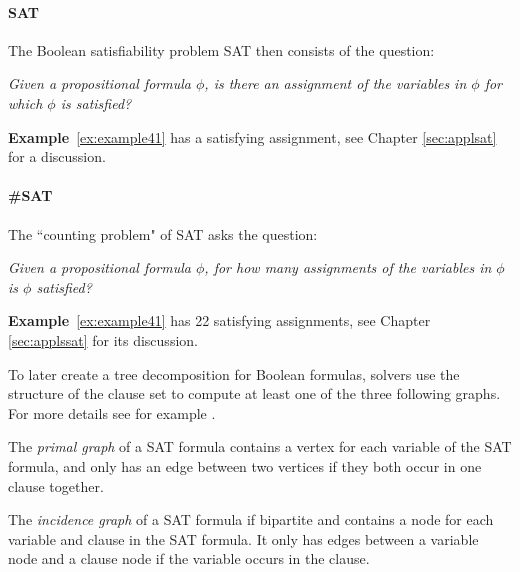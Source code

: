 \documentclass[a4paper, 12pt, bibliography=totoc]{scrartcl}
\begin{document}
\paragraph{SAT}The Boolean satisfiability problem {SAT} then consists of the question: 
\begin{mdframed}[leftmargin=3em,rightmargin=3em]
 \textit{Given a propositional formula $\phi$, is there an assignment of the variables in $\phi$ for which $\phi$ is satisfied?} 
\end{mdframed}
\textbf{Example}~\ref{ex:example41} has a satisfying assignment, see Chapter \ref{sec:applsat} for a discussion.\pagebreak

\paragraph{\#SAT}The ``counting problem" of SAT asks the question:
\begin{mdframed}[leftmargin=3em,rightmargin=3em]
\textit{Given a propositional formula $\phi$, for how many assignments of the variables in $\phi$ is $\phi$ satisfied?}
\end{mdframed}
\textbf{Example}~\ref{ex:example41} has 22 satisfying assignments, see Chapter \ref{sec:applssat} for its discussion.\\
\noindent


To later create a tree decomposition for Boolean formulas, solvers use the structure of the clause set to compute at least one of the three following graphs.
For more details see for example \cite[Chapter~2.1]{DiplomarbeitZisser}.

The \textit{primal graph} of a SAT formula contains a vertex for each variable of the SAT formula, and only has an edge between two vertices if they both occur in one clause together.

The \textit{incidence graph} of a SAT formula if bipartite and contains a node for each variable and clause in the SAT formula. It only has edges between a variable node and a clause node if the variable occurs in the clause.
\end{document}
